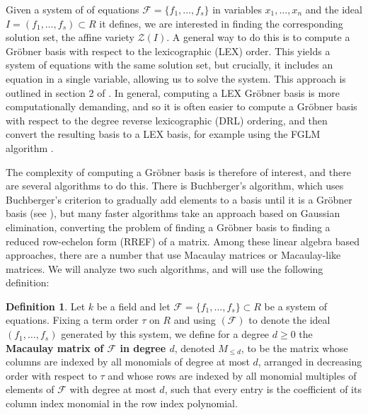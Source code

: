 \documentclass[11pt]{article}
\newcommand{\F}{\mathcal{F}}
\theoremstyle{definition}
\newtheorem{definition}{Definition}
\begin{document}
Given a system of of equations $\mathcal{F} = \{f_1, \dots, f_s\}$ in variables $x_1, \dots, x_n$ and the ideal $I = (f_1, \dots, f_s) \subset R$ it defines, we are interested in finding the corresponding solution set, the affine variety $\mathcal{Z}(I)$. A general way to do this is to compute a Gröbner basis with respect to the lexicographic (LEX) order. This yields a system of equations with the same solution set, but crucially, it includes an equation in a single variable, allowing us to solve the system. This approach is outlined in section 2 of \cite{caminata2020solving}. In general, computing a LEX Gröbner basis is more computationally demanding, and so it is often easier to compute a Gröbner basis with respect to the degree reverse lexicographic (DRL) ordering, and then convert the resulting basis to a LEX basis, for example using the FGLM algorithm \cite{faugere1993efficient}.

The complexity of computing a Gröbner basis is therefore of interest, and there are several algorithms to do this. There is Buchberger's algorithm, which uses Buchberger's criterion to gradually add elements to a basis until it is a Gröbner basis (see \cite{cox2013ideals}), but many faster algorithms take an approach based on Gaussian elimination, converting the problem of finding a Gröbner basis to finding a reduced row-echelon form (RREF) of a matrix. Among these linear algebra based approaches, there are a number that use Macaulay matrices or Macaulay-like matrices. We will analyze two such algorithms, and will use the following definition:


\begin{definition}
	Let $k$ be a field and let $\F = \{f_1, \dots, f_s\} \subset R$ be a system of equations. Fixing a term order $\tau$ on $R$ and using $(\F)$ to denote the ideal $(f_1, \dots, f_s)$ generated by this system, we define for a degree $d \geq 0$ the \textbf{Macaulay matrix of $\F$ in degree $d$}, denoted $M_{\leq d}$, to be the matrix whose columns are indexed by all monomials of degree at most $d$, arranged in decreasing order with respect to $\tau$ and whose rows are indexed by all monomial multiples of elements of $\F$ with degree at most $d$, such that every entry is the coefficient of its column index monomial in the row index polynomial.  
\end{definition}
\end{document}
